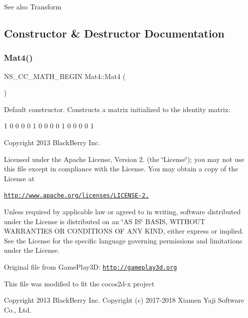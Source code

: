 \begin{DoxySeeAlso}{See also}
Transform 
\end{DoxySeeAlso}


\subsection{Constructor \& Destructor Documentation}
\mbox{\label{classMat4_ab26a891e96114b174d518adaf9059db5}} 
\subsubsection{\texorpdfstring{Mat4()}{Mat4()}\hspace{0.1cm}{\footnotesize\ttfamily [1/8]}}
{\footnotesize\ttfamily N\+S\+\_\+\+C\+C\+\_\+\+M\+A\+T\+H\+\_\+\+B\+E\+G\+IN Mat4\+::\+Mat4 (\begin{DoxyParamCaption}{ }\end{DoxyParamCaption})}

Default constructor. Constructs a matrix initialized to the identity matrix\+: \begin{DoxyVerb}1  0  0  0
0  1  0  0
0  0  1  0
0  0  0  1\end{DoxyVerb}


Copyright 2013 Black\+Berry Inc.

Licensed under the Apache License, Version 2. (the \char`\"{}\+License\char`\"{}); you may not use this file except in compliance with the License. You may obtain a copy of the License at

\href{http://www.apache.org/licenses/LICENSE-2.0}{\tt http\+://www.\+apache.\+org/licenses/\+L\+I\+C\+E\+N\+S\+E-\/2.}

Unless required by applicable law or agreed to in writing, software distributed under the License is distributed on an \char`\"{}\+A\+S I\+S\char`\"{} B\+A\+S\+IS, W\+I\+T\+H\+O\+UT W\+A\+R\+R\+A\+N\+T\+I\+ES OR C\+O\+N\+D\+I\+T\+I\+O\+NS OF A\+NY K\+I\+ND, either express or implied. See the License for the specific language governing permissions and limitations under the License.

Original file from Game\+Play3D\+: \href{http://gameplay3d.org}{\tt http\+://gameplay3d.\+org}

This file was modified to fit the cocos2d-\/x project

Copyright 2013 Black\+Berry Inc. Copyright (c) 2017-\/2018 Xiamen Yaji Software Co., Ltd.

